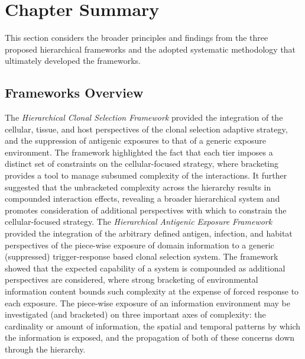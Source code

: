 %
%
\section{Chapter Summary}
\label{sec:framework:summary}
This section considers the broader principles and findings from the three proposed hierarchical frameworks and the adopted systematic methodology that ultimately developed the frameworks.

%
%
\subsection{Frameworks Overview}
The \emph{Hierarchical Clonal Selection Framework} provided the integration of the cellular, tissue, and host perspectives of the clonal selection adaptive strategy, and the suppression of antigenic exposures to that of a generic exposure environment. The framework highlighted the fact that each tier imposes a distinct set of constraints on the cellular-focused strategy, where bracketing provides a tool to manage subsumed complexity of the interactions. It further suggested that the unbracketed complexity across the hierarchy results in compounded interaction effects, revealing a broader hierarchical system and promotes consideration of additional perspectives with which to constrain the cellular-focused strategy.
The \emph{Hierarchical Antigenic Exposure Framework} provided the integration of the arbitrary defined antigen, infection, and habitat perspectives of the piece-wise exposure of domain information to a generic (suppressed) trigger-response based clonal selection system. The framework showed that the expected capability of a system is compounded as additional perspectives are considered, where strong bracketing of environmental information content bounds such complexity at the expense of forced response to each exposure. The piece-wise exposure of an information environment may be investigated (and bracketed) on three important axes of complexity: the cardinality or amount of information, the spatial and temporal patterns by which the information is exposed, and the propagation of both of these concerns down through the hierarchy. 

